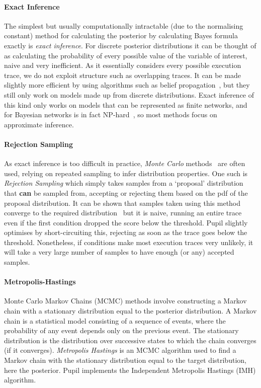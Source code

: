 \documentclass[sigconf]{acmart}
\newcommand{\pupil}{Pupil\xspace}
\begin{document}
\paragraph{Exact Inference}
The simplest but usually computationally intractable (due to the normalising constant) method for calculating the posterior by calculating Bayes formula exactly is \emph{exact inference}. For discrete posterior distributions it can be thought of as calculating the probability of every possible value of the variable of interest, naive and very inefficient. As it essentially considers every possible execution trace, we do not exploit structure such as overlapping traces. It can be made slightly more efficient by using algorithms such as belief propagation~\cite{belief-prop}, but they still only work on models made up from discrete distributions. Exact inference of this kind only works on models that can be represented as finite networks, and for Bayesian networks is in fact NP-hard~\cite{cooper1990computational}, so most methods focus on approximate inference.

\paragraph{Rejection Sampling}
As exact inference is too difficult in practice, \emph{Monte Carlo} methods~\cite{monte-carlo} are often used, relying on repeated sampling to infer distribution properties. One such is \emph{Rejection Sampling} which simply takes samples from a `proposal' distribution that {\bf can} be sampled from, accepting or rejecting them based on the pdf of the proposal distribution. It can be shown that samples taken using this method converge to the required distribution~\cite{flury1990acceptance} but it is naive, running an entire trace even if the first condition dropped the score below the threshold. \pupil slightly optimises by short-circuiting this, rejecting as soon as the trace goes below the threshold. Nonetheless, if conditions make most execution traces very unlikely, it will take a very large number of samples to have enough (or any) accepted samples.

\paragraph{Metropolis-Hastings}
Monte Carlo Markov Chains (MCMC) methods involve constructing a Markov chain with a stationary distribution equal to the posterior distribution. A Markov chain is a statistical model consisting of a sequence of events, where the probability of any event depends only on the previous event. The stationary distribution is the distribution over successive states to which the chain converges (if it converges). \emph{Metropolis Hastings} is an MCMC algorithm used to find a Markov chain with the stationary distribution equal to the target distribution, here the posterior. \pupil implements the Independent Metropolis Hastings (IMH) algorithm.
\end{document}

